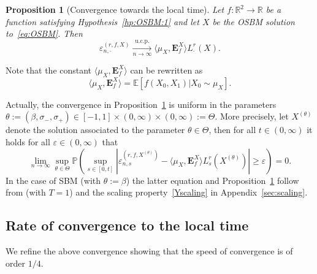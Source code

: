 \documentclass[12pt]{article}
\numberwithin{equation}{section}
\newtheorem{proposition}{Proposition}
\theoremstyle{definition}
\theoremstyle{remark}
\newcommand{\convucp}[1][]{\xrightarrow[#1]{\mathrm{u.c.p.}}}
\newcommand{\RR}{\mathbb{R}}
\newcommand{\EE}{\mathbb{E}}
\newcommand{\vd}{\,\mathrm{d}}
\newcommand{\bfF}[1]{\mathbf{E}^X_{#1}}
\begin{document}
\begin{proposition}[Convergence towards the local time] \label{prop:lmt:2:OSBM}
Let $f \colon \RR^2 \to \RR$ be a function satisfying Hypothesis~\ref{hp:OSBM:1} and let $X$ be the OSBM solution to~\eqref{eq:OSBM}. 
%
Then 
\begin{equation} \label{prop:lmt:2:OSBM:eq}
	\varepsilon_{n,\cdot}^{(r,f,X)} \convucp[n\to\infty] \langle \mu_X , \bfF f \rangle L^r_{\cdot}(X).
\end{equation}
\end{proposition}
%
% 
%
\noindent Note that the constant $\langle \mu_X , \bfF{f} \rangle$ can be rewritten as
\begin{equation}
	\langle \mu_X , \bfF{f} \rangle 
	= \EE\!\left[ f(X_0,X_1)|X_0 \sim \mu_X\right].
\end{equation}


\noindent Actually, the convergence in Proposition~\ref{prop:lmt:2:OSBM} is uniform in the parameters $\theta:= (\beta, \sigma_-,\sigma_+) \in [-1,1] \times (0,\infty) \times (0,\infty) :=\Theta$. 
More precisely, let $X^{(\theta)}$ denote the solution associated to the parameter $\theta \in \Theta$, then for all $t\in (0,\infty)$ it holds for all $\varepsilon \in (0,\infty)$ that 
\begin{equation} 
	\lim_{n\to\infty} \sup_{\theta \in \Theta} \mathbb{P}\left(  \sup_{s\in [0,t]} \left| \varepsilon_{n,s}^{(r,f,X^{(\theta)})} - \langle \mu_X , \bfF{f} \rangle L^r_{s}(X^{(\theta)})\right| \geq \varepsilon \right)
	= 0.
\end{equation}
In the case of SBM (with $\theta:=\beta$) the latter equation and Proposition~\ref{prop:lmt:2:OSBM} follow from \cite[Proposition~2]{lmt1} (with $T=1$) and the scaling property~\eqref{Yscaling} in Appendix~\ref{sec:scaling}.



\subsection{Rate of convergence to the local time} \label{sec:conv:rate}
%
We refine the above convergence showing that the speed of convergence is of order $1/4$.
\end{document}
